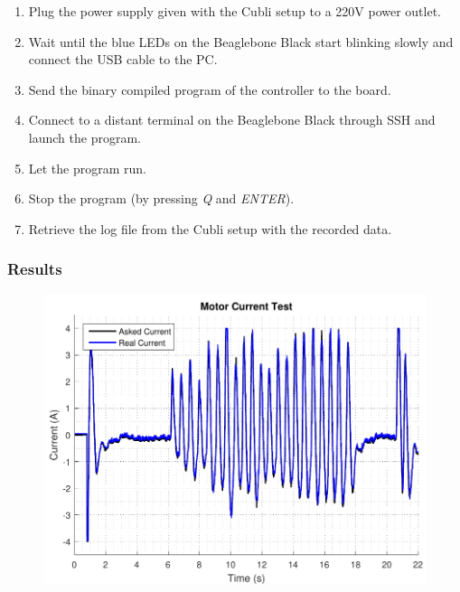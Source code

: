 \begin{enumerate}
  \item Plug the power supply given with the Cubli setup to a \si{220}{V} power outlet.
  \item Wait until the blue LEDs on the Beaglebone Black start blinking slowly and connect the USB cable to the PC.
  \item Send the binary compiled program of the controller to the board.
  \item Connect to a distant terminal on the Beaglebone Black through SSH and launch the program.
  \item Let the program run.
  \item Stop the program (by pressing \textit{Q} and \textit{ENTER}).
  \item Retrieve the log file from the Cubli setup with the recorded data.
\end{enumerate}

\subsubsection{Results}

\begin{figure}[H]
	\includegraphics[scale=.75]{figures/motorCurrentTest}
	\centering
	\caption{}
\end{figure} \label{motorCurrentTest}
